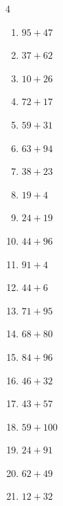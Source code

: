 \begin{multicols}{4}
\begin{enumerate}
  \item $95+47$
        \phantom{$=142$}

  \item $37+62$
        \phantom{$=99$}

  \item $10+26$
        \phantom{$=36$}

  \item $72+17$
        \phantom{$=89$}

  \item $59+31$
        \phantom{$=90$}

  \item $63+94$
        \phantom{$=157$}

  \item $38+23$
        \phantom{$=61$}

  \item $19+4$
        \phantom{$=23$}

  \item $24+19$
        \phantom{$=43$}

  \item $44+96$
        \phantom{$=140$}

  \item $91+4$
        \phantom{$=95$}

  \item $44+6$
        \phantom{$=50$}

  \item $71+95$
        \phantom{$=166$}

  \item $68+80$
        \phantom{$=148$}

  \item $84+96$
        \phantom{$=180$}

  \item $46+32$
        \phantom{$=78$}

  \item $43+57$
        \phantom{$=100$}

  \item $59+100$
        \phantom{$=159$}

\columnbreak %

  \item $24+91$
        \phantom{$=115$}

  \item $62+49$
        \phantom{$=111$}

  \item $12+32$
        \phantom{$=44$}


\end{enumerate}
\end{multicols}
